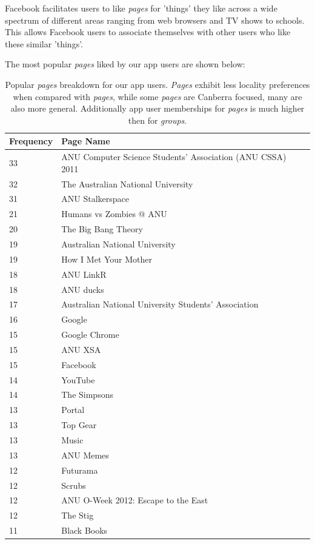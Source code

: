 Facebook facilitates users to like \emph{pages} for 'things' they like across a wide spectrum of different areas ranging from 
web browsers and TV shows to schools. This allows Facebook users to associate themselves with other users who like these similar 'things'.

\clearpage

The most popular \emph{pages} liked by our app users are shown below:

\begin{table}[!htbp]
\centering
	\begin{tabular}{|l|l|} %
		\hline
		\textbf{\small{Frequency}} & \textbf{\small{Page Name}}  \\ \hline
		33 & \small{ANU Computer Science Students' Association (ANU CSSA) 2011} \\ \hline
		32 & \small{The Australian National University} \\ \hline
		31 & \small{ANU Stalkerspace} \\ \hline
		21 & \small{Humans vs Zombies @ ANU} \\ \hline
		20 & \small{The Big Bang Theory} \\ \hline
		19 & \small{Australian National University} \\ \hline
		19 & \small{How I Met Your Mother} \\ \hline
		18 & \small{ANU LinkR} \\ \hline
		18 & \small{ANU ducks} \\ \hline
		17 & \small{Australian National University Students' Association} \\ \hline
		16 & \small{Google} \\ \hline
		15 & \small{Google Chrome} \\ \hline
		15 & \small{ANU XSA} \\ \hline
		15 & \small{Facebook} \\ \hline
		14 & \small{YouTube} \\ \hline
		14 & \small{The Simpsons} \\ \hline
		13 & \small{Portal} \\ \hline
		13 & \small{Top Gear} \\ \hline
		13 & \small{Music} \\ \hline
		13 & \small{ANU Memes} \\ \hline
		12 & \small{Futurama} \\ \hline
		12 & \small{Scrubs} \\ \hline
		12 & \small{ANU O-Week 2012: Escape to the East} \\ \hline
		12 & \small{The Stig} \\ \hline
		11 & \small{Black Books} \\ \hline
	\end{tabular}
	\caption{Popular \emph{pages} breakdown for our app users. \emph{Pages} exhibit less locality preferences when compared with \emph{pages},
			 while some \emph{pages} are Canberra focused, many are also more general. Additionally app user memberships for \emph{pages} is 
			 much higher then for \emph{groups}.}
	\label{tab:revpol}
\end{table}

